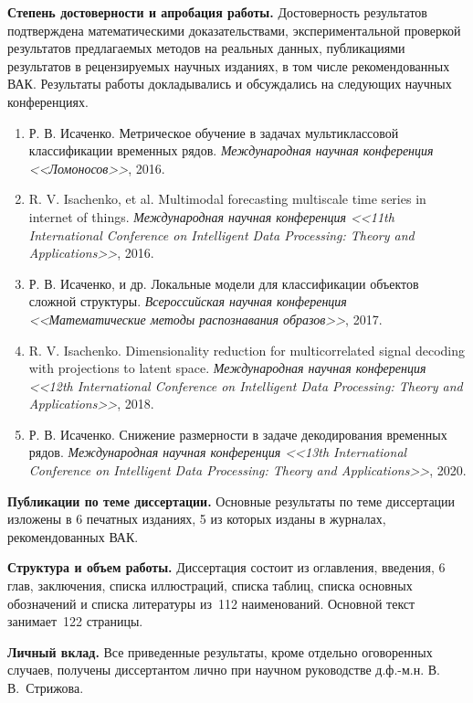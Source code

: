 \documentclass[11pt, a5paper]{dissert}
\begin{document}
\vspace{0.5cm}
\textbf{Степень достоверности и апробация работы.}
Достоверность результатов подтверждена математическими доказательствами, экспериментальной проверкой результатов предлагаемых методов на реальных данных, публикациями результатов в рецензируемых научных изданиях, в том числе рекомендованных ВАК. 
Результаты работы докладывались и обсуждались на следующих научных конференциях.
\vspace{0.2cm}
\begin{enumerate}
	\item Р. В. Исаченко. Метрическое обучение в задачах мультиклассовой классификации временных рядов. \textit{Международная научная конференция <<Ломоносов>>}, 2016.
	\item R. V. Isachenko, et al. Multimodal forecasting multiscale time series in internet of things. \textit{Международная научная конференция  <<11th International Conference on Intelligent Data Processing: Theory and Applications>>}, 2016.
	\item Р. В. Исаченко, и др. Локальные модели для классификации объектов сложной структуры. \textit{Всероссийская научная конференция <<Математические методы распознавания образов>>}, 2017.
	\item R. V. Isachenko. Dimensionality reduction for multicorrelated signal decoding with projections to latent space. \textit{Международная научная конференция  <<12th International Conference on Intelligent Data Processing: Theory and Applications>>}, 2018.
	\item Р. В. Исаченко. Снижение размерности в задаче декодирования временных рядов. \textit{Международная научная конференция  <<13th International Conference on Intelligent Data Processing: Theory and Applications>>}, 2020.
\end{enumerate} 

\vspace{0.5cm}
\textbf{Публикации по теме диссертации.}
Основные результаты по теме диссертации изложены в 6 печатных изданиях, 5 из которых изданы в журналах, рекомендованных ВАК.

\vspace{0.5cm}
\textbf{Структура и объем работы.}
Диссертация состоит из оглавления, введения, 6 глав, заключения, списка иллюстраций, списка таблиц, списка основных обозначений и списка литературы из~112 наименований. 
Основной текст занимает~122 страницы.

\vspace{0.5cm}
\textbf{Личный вклад.}
Все приведенные результаты, кроме отдельно оговоренных случаев, получены диссертантом лично при научном руководстве д.ф.-м.н. В.\,В.~Стрижова.
\end{document}
